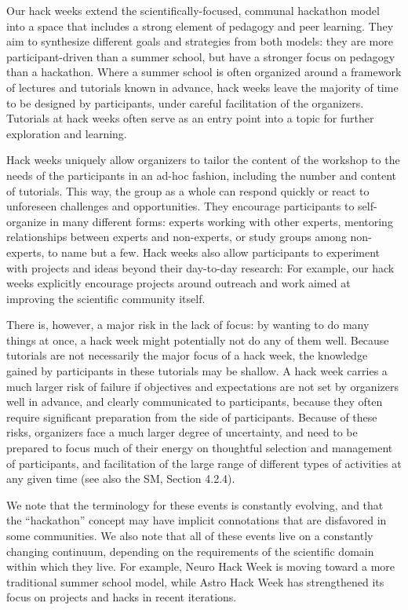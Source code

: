 Our hack weeks extend the scientifically-focused, communal hackathon model into a space that includes a strong element of pedagogy and peer learning. They aim to synthesize different goals and strategies from both models: they are more participant-driven than a summer school, but have a stronger focus on pedagogy than a hackathon. Where a summer school is often organized around a framework of lectures and tutorials known in advance, hack weeks leave the majority of time to be designed by participants, under careful facilitation of the organizers. Tutorials at hack weeks often serve as an entry point into a topic for further exploration and learning. %

Hack weeks uniquely allow organizers to tailor the content of the workshop to the needs of the participants in an ad-hoc fashion, including the number and content of tutorials. This way, the group as a whole can respond quickly or react to unforeseen challenges and opportunities. They encourage participants to self-organize in many different forms: experts working with other experts, mentoring relationships between experts and non-experts, or study groups among non-experts, to name but a few. Hack weeks also allow participants to experiment with projects and ideas beyond their day-to-day research: For example, our hack weeks explicitly encourage projects around outreach and work aimed at improving the scientific community itself.

There is, however, a major risk in the lack of focus: by wanting to do many things at once, a hack week might potentially not do any of them well. Because tutorials are not necessarily the major focus of a hack week, the knowledge gained by participants in these tutorials may be shallow. A hack week carries a much larger risk of failure if objectives and expectations are not set by organizers well in advance, and clearly communicated to participants, because they often require significant preparation from the side of participants.
Because of these risks, organizers face a much larger degree of uncertainty, and need to be prepared to focus much of their energy on thoughtful selection and management of participants, and facilitation of the large range of different types of activities at any given time (see also the SM, Section 4.2.4).

We note that the terminology for these events is constantly evolving, and that the ``hackathon'' concept may have implicit connotations that are disfavored in some communities. We also note that all of these events live on a constantly changing continuum, depending on the requirements of the scientific domain within which they live. For example, Neuro Hack Week is moving toward a more traditional summer school model, while Astro Hack Week has strengthened its focus on projects and hacks in recent iterations.
